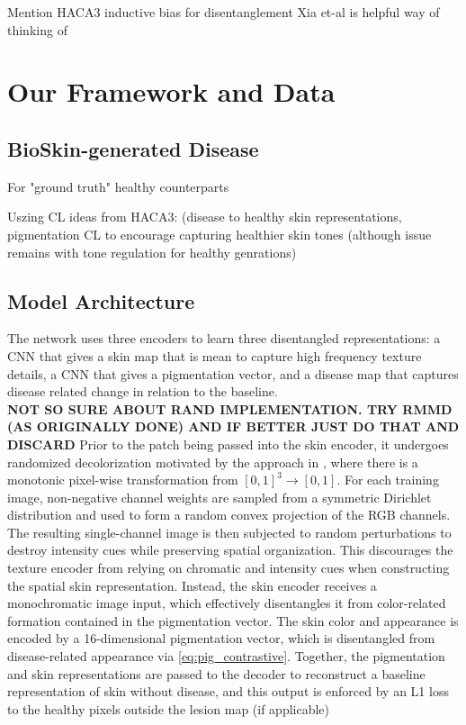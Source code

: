 \documentclass{midl} %
\begin{document}
Mention HACA3 inductive bias for disentanglement 
Xia et-al is helpful way of thinking of 


\section{Our Framework and Data} 
\subsection{BioSkin-generated Disease}
For "ground truth" healthy counterparts 

Uszing CL ideas from HACA3: (disease to healthy skin representations, pigmentation CL to encourage capturing healthier skin tones (although issue remains with tone regulation for healthy genrations) 

\subsection{Model Architecture}
The network uses three encoders to learn three disentangled representations: a CNN that gives a skin map that is mean to capture high frequency texture details, a CNN that gives a pigmentation vector, and a disease map that captures disease related change in relation to the baseline.\\

\textbf{NOT SO SURE ABOUT RAND IMPLEMENTATION. TRY RMMD (AS ORIGINALLY DONE) AND IF BETTER JUST DO THAT AND DISCARD }
Prior to the patch being passed into the skin encoder, it undergoes randomized decolorization motivated by the approach in \cite{yang_automated_2027}, where there is a monotonic pixel-wise transformation from $[0, 1]^3  \rightarrow [0,1]$. For each training image, non-negative channel weights are sampled from a symmetric Dirichlet distribution and used to form a random convex projection of the RGB channels. The resulting single-channel image is then subjected to random perturbations to destroy intensity cues while preserving spatial organization. This discourages the texture encoder from relying on chromatic and intensity cues when constructing the spatial skin representation. Instead, the skin encoder receives a monochromatic image input, which effectively disentangles it from color-related formation contained in the pigmentation vector. The skin color and appearance is encoded by a 16-dimensional pigmentation vector, which is disentangled from disease-related appearance via \eqref{eq:pig_contrastive}. Together, the pigmentation and skin representations are passed to the decoder to reconstruct a baseline representation of skin without disease, and this output is enforced by an L1 loss to the healthy pixels outside the lesion map (if applicable) \\
\end{document}
